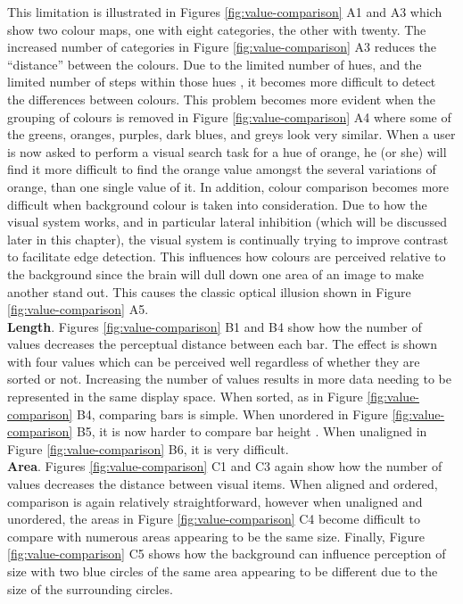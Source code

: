 This limitation is illustrated in Figures \ref{fig:value-comparison} A1 and A3 which show two colour maps, one with eight categories, the other with twenty. 
The increased number of categories in Figure \ref{fig:value-comparison} A3 reduces the ``distance'' between the colours. 
Due to the limited number of hues, and the limited number of steps within those hues \cite{ware13}, it becomes more difficult to detect the differences between colours.  
This problem becomes more evident when the grouping of colours is removed in Figure \ref{fig:value-comparison} A4 where some of the greens, oranges, purples, dark blues, and greys look very similar. 
When a user is now asked to perform a visual search task for a hue of orange, he (or she) will find it more difficult to find the orange value amongst the several variations of orange, than one single value of it. 
In addition, colour comparison becomes more difficult when background colour is taken into consideration. 
Due to how the visual system works, and in particular lateral inhibition (which will be discussed later in this chapter), the visual system is continually trying to improve contrast to facilitate edge detection. 
This influences how colours are perceived relative to the background since the brain will dull down one area of an image to make another stand out. 
This causes the classic optical illusion shown in Figure \ref{fig:value-comparison} A5.\\

\noindent\textbf{Length}. Figures \ref{fig:value-comparison} B1 and B4 show how the number of values decreases the perceptual distance between each bar.
The effect is shown with four values which can be perceived well regardless of whether they are sorted or not.
Increasing the number of values results in more data needing to be represented in the same display space.
When sorted, as in Figure \ref{fig:value-comparison} B4, comparing bars is simple.
When unordered in Figure \ref{fig:value-comparison} B5, it is now harder to compare bar height \cite{Chung29112013}. 
When unaligned in Figure \ref{fig:value-comparison} B6, it is very difficult. \\ 

\noindent\textbf{Area}. Figures \ref{fig:value-comparison} C1 and C3 again show how the number of values decreases the distance between visual items. 
When aligned and ordered, comparison is again relatively straightforward, however when unaligned and unordered, the areas in 
Figure \ref{fig:value-comparison} C4 become difficult to compare with numerous areas appearing to be the same size.
Finally, Figure \ref{fig:value-comparison} C5 shows how the background can influence perception of size with two blue circles of the same area appearing to be different due to the size of the surrounding circles.

